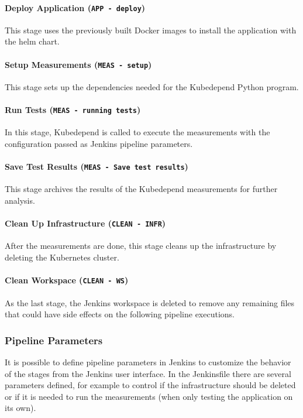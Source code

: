 \paragraph{Deploy Application (\texttt{APP - deploy})} This stage uses the previously built Docker images to install the application with the helm chart.

\paragraph{Setup Measurements (\texttt{MEAS - setup})} This stage sets up the dependencies needed for the Kubedepend Python program.

\paragraph{Run Tests (\texttt{MEAS - running tests})} In this stage, Kubedepend is called to execute the measurements with the configuration passed as Jenkins pipeline parameters.

\paragraph{Save Test Results (\texttt{MEAS - Save test results})} This stage archives the results of the Kubedepend measurements for further analysis.

\paragraph{Clean Up Infrastructure (\texttt{CLEAN - INFR})} After the measurements are done, this stage cleans up the infrastructure by deleting the Kubernetes cluster.

\paragraph{Clean Workspace (\texttt{CLEAN - WS})} As the last stage, the Jenkins workspace is deleted to remove any remaining files that could have side effects on the following pipeline executions.

\subsubsection{Pipeline Parameters}

It is possible to define pipeline parameters in Jenkins to customize the behavior of the stages from the Jenkins user interface. In the Jenkinsfile there are several parameters defined, for example to control if the infrastructure should be deleted or if it is needed to run the measurements (\eg when only testing the application on its own).


